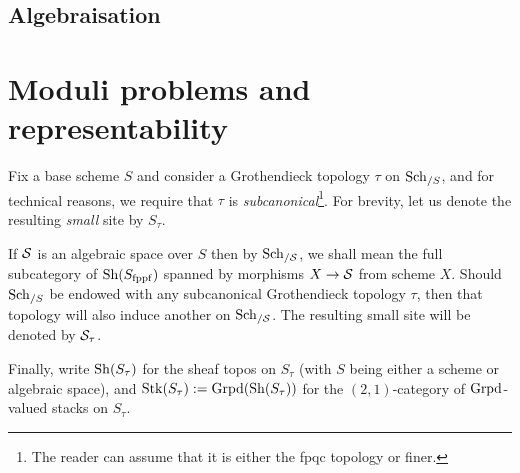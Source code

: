             \minitoc

            

            
            
        \chapter{Algebraisation}
            \begin{abstract}
                
            \end{abstract}
            
            \minitoc

            

            

            

            

    \part{Moduli problems and representability}
        \begin{convention}
            Fix a base scheme $S$ and consider a Grothendieck topology $\tau$ on $\mathrm{Sch}_{/S}$, and for technical reasons, we require that $\tau$ is \textit{subcanonical}\footnote{The reader can assume that it is either the fpqc topology or finer.}. For brevity, let us denote the resulting \textit{small} site by $S_{\tau}$.
    
            If $\mathcal{S}$ is an algebraic space over $S$ then by $\mathrm{Sch}_{/\mathcal{S}}$, we shall mean the full subcategory of $\mathrm{Sh}( S_{\mathrm{fppf}} )$ spanned by morphisms $X \to \mathcal{S}$ from scheme $X$. Should $\mathrm{Sch}_{/S}$ be endowed with any subcanonical Grothendieck topology $\tau$, then that topology will also induce another on $\mathrm{Sch}_{/\mathcal{S}}$. The resulting small site will be denoted by $\mathcal{S}_{\tau}$.

            Finally, write $\mathrm{Sh}(S_{\tau})$ for the sheaf topos on $S_{\tau}$ (with $S$ being either a scheme or algebraic space), and $\mathrm{Stk}(S_{\tau}) := \mathrm{Grpd}(\mathrm{Sh}(S_{\tau}))$ for the $(2, 1)$-category of $\mathrm{Grpd}$-valued stacks on $S_{\tau}$. 
        \end{convention}

